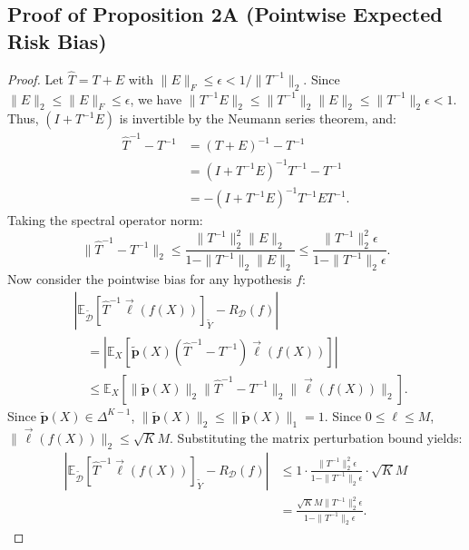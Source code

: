 \documentclass[journal]{IEEEtran}
\theoremstyle{definition}
\begin{document}
\subsection{Proof of Proposition 2A (Pointwise Expected Risk Bias)}
\label{sec:proof_bias}
\begin{proof}
Let $\hat{T} = T + E$ with $\|E\|_F \le \epsilon < 1/\|T^{-1}\|_2$. Since $\|E\|_2 \le \|E\|_F \le \epsilon$, we have $\|T^{-1} E\|_2 \le \|T^{-1}\|_2 \|E\|_2 \le \|T^{-1}\|_2 \epsilon < 1$. Thus, $(I + T^{-1} E)$ is invertible by the Neumann series theorem, and:
\begin{align}
\hat{T}^{-1} - T^{-1} &= (T + E)^{-1} - T^{-1} \nonumber \\
&= (I + T^{-1} E)^{-1} T^{-1} - T^{-1} \nonumber \\
&= - (I + T^{-1} E)^{-1} T^{-1} E T^{-1}.
\end{align}
Taking the spectral operator norm:
\begin{equation}
\|\hat{T}^{-1} - T^{-1}\|_2 \le \frac{\|T^{-1}\|_2^2 \|E\|_2}{1 - \|T^{-1}\|_2 \|E\|_2} \le \frac{\|T^{-1}\|_2^2 \epsilon}{1 - \|T^{-1}\|_2 \epsilon}.
\end{equation}
Now consider the pointwise bias for any hypothesis $f$:
\begin{align}
&\left| \mathbb{E}_{\tilde{\mathcal{D}}} [\hat{T}^{-1} \vec{\ell}(f(X))]_{\tilde{Y}} - R_{\mathcal{D}}(f) \right| \nonumber \\
&\quad = \left| \mathbb{E}_X \left[ \tilde{\mathbf{p}}(X) (\hat{T}^{-1} - T^{-1}) \vec{\ell}(f(X)) \right] \right| \nonumber \\
&\quad \le \mathbb{E}_X \left[ \|\tilde{\mathbf{p}}(X)\|_2 \|\hat{T}^{-1} - T^{-1}\|_2 \|\vec{\ell}(f(X))\|_2 \right].
\end{align}
Since $\tilde{\mathbf{p}}(X) \in \Delta^{K-1}$, $\|\tilde{\mathbf{p}}(X)\|_2 \le \|\tilde{\mathbf{p}}(X)\|_1 = 1$. Since $0 \le \ell \le M$, $\|\vec{\ell}(f(X))\|_2 \le \sqrt{K} M$. Substituting the matrix perturbation bound yields:
\begin{align}
\left| \mathbb{E}_{\tilde{\mathcal{D}}} [\hat{T}^{-1} \vec{\ell}(f(X))]_{\tilde{Y}} - R_{\mathcal{D}}(f) \right| &\le 1 \cdot \frac{\|T^{-1}\|_2^2 \epsilon}{1 - \|T^{-1}\|_2 \epsilon} \cdot \sqrt{K} M \nonumber \\
&= \frac{\sqrt{K} M \|T^{-1}\|_2^2 \epsilon}{1 - \|T^{-1}\|_2 \epsilon}.
\end{align}
\end{proof}
\end{document}
